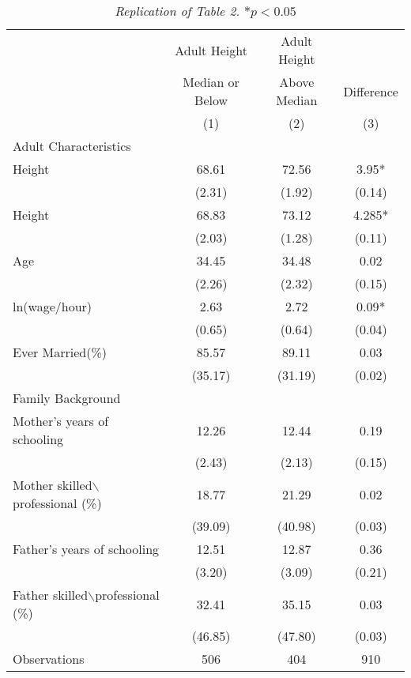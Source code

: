 \documentclass[12pt]{article}
\begin{document}
\clearpage
{} \todo
\begin{table}[h!]
    \begin{tabular}{|l | c | c | c |} 
        \hline 
         & Adult Height  & 
           Adult Height  & 
            \\
         & Median or Below  & 
           Above Median & 
            Difference \\
         & (1) & 
           (2) & 
           (3) \\
        \hline
        Adult Characteristics & & &\\
        \hline
        \tabindent 1981 Height & 68.61  & 72.56  & 3.95* \\
                            & (2.31) & (1.92) & (0.14)\\
        \hline
        \tabindent 1985 Height & 68.83  & 73.12  & 4.285* \\
                           & (2.03) & (1.28) &  (0.11) \\
        \hline
        \tabindent Age     & 34.45  & 34.48  & 0.02 \\
                           & (2.26) & (2.32) &  (0.15)       \\
        \hline
        \tabindent ln(wage/hour)     & 2.63   & 2.72  & 0.09* \\
                                     & (0.65) & (0.64) &  (0.04)       \\
        \hline
        \tabindent Ever Married(\%)  & 85.57  & 89.11 & 0.03 \\
                                     & (35.17) & (31.19) & (0.02) \\
        \hline
        Family Background & & & \\
        \hline
        \tabindent Mother's years of schooling & 12.26 & 12.44 & 0.19\\
                                               & (2.43) & (2.13) & (0.15) \\
        \hline
        \tabindent Mother skilled$\backslash$professional (\%) & 18.77 & 21.29 & 0.02 \\
                                                 & (39.09) & (40.98) & (0.03) \\
        \hline
        \tabindent Father's years of schooling & 12.51 & 12.87 & 0.36 \\
                                               & (3.20) & (3.09) & (0.21) \\
        \hline
        \tabindent Father skilled$\backslash$professional (\%) & 32.41 & 35.15 & 0.03 \\
                                                               & (46.85) & (47.80) & (0.03) \\
        \hline
        Observations & 506 & 404 & 910 \\
        \hline       
    \end{tabular}
    \caption{\textit{Replication of \textcite{Persico2004} Table 2. $* p<0.05$}}
\end{table}

\clearpage

\printbibliography 
\end{document}
